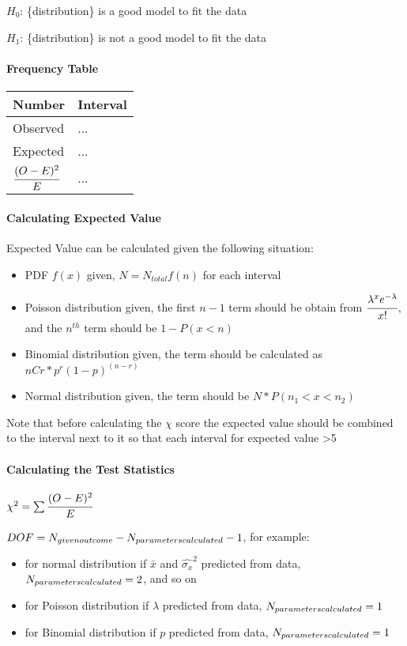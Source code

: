 \documentclass[]{article}
\let\oldparagraph\paragraph
\renewcommand{\paragraph}[1]{\oldparagraph{#1}\mbox{}}
\begin{document}
\(H_0\): \{distribution\} is a good model to fit the data

\(H_1\): \{distribution\} is not a good model to fit the data

\paragraph{Frequency Table}\label{header-n197}

\begin{longtable}[]{@{}ll@{}}
\toprule
Number & Interval\tabularnewline
\midrule
\endhead
Observed & ...\tabularnewline
Expected & ...\tabularnewline
\(\cfrac{(O-E)^2}{E}\) & ...\tabularnewline
\bottomrule
\end{longtable}

\paragraph{Calculating Expected Value}\label{header-n211}

Expected Value can be calculated given the following situation:

\begin{itemize}
\item
  PDF \(f(x)\) given, \(N = N_{total} f(n)\) for each interval
\item
  Poisson distribution given, the first \(n-1\) term should be obtain
  from \(\cfrac{\lambda^x e^{-\lambda}}{x!}\), and the \(n^{th}\) term
  should be \(1-P(x<n)\)
\item
  Binomial distribution given, the term should be calculated as
  \(nCr * p^r (1-p)^{(n-r)}\)
\item
  Normal distribution given, the term should be \(N*P(n_1<x<n_2)\)
\end{itemize}

Note that before calculating the \(\chi\) score the expected value
should be combined to the interval next to it so that each interval for
expected value \textgreater{}5

\paragraph{Calculating the Test Statistics}\label{header-n223}

\(\chi ^2 = \sum\cfrac{(O-E)^2}{E}\)

\(DOF = N_{given \space outcome} - N_{parameters\space calculated} - 1\),
for example:

\begin{itemize}
\item
  for normal distribution if \(\bar{x}\) and \(\hat{\sigma_x}^2\)
  predicted from data, \(N_{parameters\space calculated} = 2\), and so
  on
\item
  for Poisson distribution if \(\lambda\) predicted from data,
  \(N_{parameters\space calculated} = 1\)
\item
  for Binomial distribution if \(p\) predicted from data,
  \(N_{parameters\space calculated} = 1\)
\end{itemize}
\end{document}
